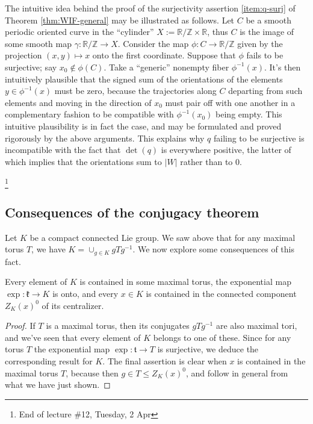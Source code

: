 \documentclass[reqno]{amsart} 
\begin{document}
\begin{remark}
  The intuitive idea behind the proof of the surjectivity assertion \ref{item:q-surj} of Theorem \ref{thm:WIF-general} may be illustrated as follows.  Let $C$ be a smooth periodic oriented curve in the ``cylinder'' $X := \mathbb{R}/\mathbb{Z} \times \mathbb{R}$, thus $C$ is the image of some smooth map $\gamma : \mathbb{R}/\mathbb{Z} \rightarrow X$.  Consider the map $\phi : C \rightarrow \mathbb{R}/\mathbb{Z}$ given by the projection $(x,y) \mapsto x$ onto the first coordinate.  Suppose that $\phi$ fails to be surjective; say $x_0 \notin \phi(C)$.  Take a ``generic'' nonempty fiber $\phi^{-1}(x)$.  It's then intuitively plausible that the signed sum of the orientations of the elements $y \in \phi^{-1}(x)$ must be zero, because the trajectories along $C$ departing from such elements and moving in the direction of $x_0$ must pair off with one another in a complementary fashion to be compatible with $\phi^{-1}(x_0)$ being empty.  This intuitive plausibility is in fact the case, and may be formulated and proved rigorously by the above arguments.  This explains why $q$ failing to be surjective is incompatible with the fact that $\det(q)$ is everywhere positive, the latter of which implies that the orientations sum to $|W|$ rather than to $0$.
\end{remark}
\footnote{End of lecture \#12, Tuesday, 2 Apr}

\subsection{Consequences of the conjugacy theorem}\label{sec:cnh2vouqln}
Let $K$ be a compact connected Lie group.  We saw above that for any maximal torus $T$, we have $K = \cup_{g \in K} g T g^{-1}$.  We now explore some consequences of this fact.

\begin{theorem}\label{thm:exp-onto}
  Every element of $K$ is contained in some maximal torus, the exponential map $\exp : \mathfrak{k} \rightarrow K$ is onto, and every $x \in K$ is contained in the connected component $Z_K(x)^0$ of its centralizer.
\end{theorem}
\begin{proof}
  If $T$ is a maximal torus, then its conjugates $g T g^{-1}$ are also maximal tori, and we've seen that every element of $K$ belongs to one of these.  Since for any torus $T$ the exponential map $\exp : \mathfrak{t} \rightarrow T$ is surjective, we deduce the corresponding result for $K$.  The final assertion is clear when $x$ is contained in the maximal torus $T$, because then $g \in T \leq Z_K(x)^0$, and follow in general from what we have just shown.
\end{proof}
\end{document}
